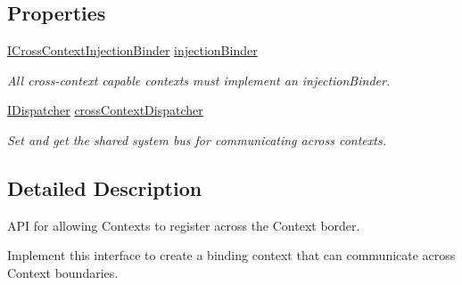 \subsection*{Properties}
\begin{DoxyCompactItemize}
\item 
\hypertarget{interfacestrange_1_1extensions_1_1context_1_1api_1_1_i_cross_context_capable_a671d1f503d40abeb5acf4f046cde3c3c}{\hyperlink{interfacestrange_1_1extensions_1_1injector_1_1api_1_1_i_cross_context_injection_binder}{I\-Cross\-Context\-Injection\-Binder} \hyperlink{interfacestrange_1_1extensions_1_1context_1_1api_1_1_i_cross_context_capable_a671d1f503d40abeb5acf4f046cde3c3c}{injection\-Binder}}\label{interfacestrange_1_1extensions_1_1context_1_1api_1_1_i_cross_context_capable_a671d1f503d40abeb5acf4f046cde3c3c}

\begin{DoxyCompactList}\small\item\em All cross-\/context capable contexts must implement an injection\-Binder. \end{DoxyCompactList}\item 
\hypertarget{interfacestrange_1_1extensions_1_1context_1_1api_1_1_i_cross_context_capable_aad7b3f38bed324e8a2fa86482ef1f733}{\hyperlink{interfacestrange_1_1extensions_1_1dispatcher_1_1api_1_1_i_dispatcher}{I\-Dispatcher} \hyperlink{interfacestrange_1_1extensions_1_1context_1_1api_1_1_i_cross_context_capable_aad7b3f38bed324e8a2fa86482ef1f733}{cross\-Context\-Dispatcher}}\label{interfacestrange_1_1extensions_1_1context_1_1api_1_1_i_cross_context_capable_aad7b3f38bed324e8a2fa86482ef1f733}

\begin{DoxyCompactList}\small\item\em Set and get the shared system bus for communicating across contexts. \end{DoxyCompactList}\end{DoxyCompactItemize}


\subsection{Detailed Description}
A\-P\-I for allowing Contexts to register across the Context border. 

Implement this interface to create a binding context that can communicate across Context boundaries.

